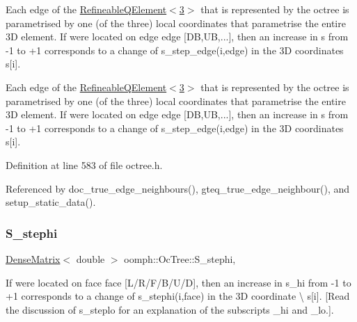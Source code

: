 Each edge of the \hyperlink{classoomph_1_1RefineableQElement_3_013_01_4}{Refineable\+Q\+Element$<$3$>$} that is represented by the octree is parametrised by one (of the three) local coordinates that parametrise the entire 3D element. If we\textquotesingle{}re located on edge {\ttfamily edge} \mbox{[}DB,UB,...\mbox{]}, then an increase in s from -\/1 to +1 corresponds to a change of {\ttfamily s\+\_\+step\+\_\+edge(i,edge)} in the 3D coordinates {\ttfamily s}\mbox{[}i\mbox{]}. 

Each edge of the \hyperlink{classoomph_1_1RefineableQElement_3_013_01_4}{Refineable\+Q\+Element$<$3$>$} that is represented by the octree is parametrised by one (of the three) local coordinates that parametrise the entire 3D element. If we\textquotesingle{}re located on edge {\ttfamily edge} \mbox{[}DB,UB,...\mbox{]}, then an increase in s from -\/1 to +1 corresponds to a change of {\ttfamily s\+\_\+step\+\_\+edge(i,edge)} in the 3D coordinates {\ttfamily s}\mbox{[}i\mbox{]}. 

Definition at line 583 of file octree.\+h.



Referenced by doc\+\_\+true\+\_\+edge\+\_\+neighbours(), gteq\+\_\+true\+\_\+edge\+\_\+neighbour(), and setup\+\_\+static\+\_\+data().

\mbox{\label{classoomph_1_1OcTree_addcc327c9831b6c57f30c8596125c236}} 
\subsubsection{\texorpdfstring{S\+\_\+stephi}{S\_stephi}}
{\footnotesize\ttfamily \hyperlink{classoomph_1_1DenseMatrix}{Dense\+Matrix}$<$ double $>$ oomph\+::\+Oc\+Tree\+::\+S\+\_\+stephi\hspace{0.3cm}{\ttfamily [static]}, {\ttfamily [private]}}



If we\textquotesingle{}re located on face {\ttfamily face} \mbox{[}L/\+R/\+F/\+B/\+U/D\mbox{]}, then an increase in s\+\_\+hi from -\/1 to +1 corresponds to a change of {\ttfamily s\+\_\+stephi(i,face)} in the 3D coordinate \textbackslash{} s\mbox{[}i\mbox{]}. \mbox{[}Read the discussion of {\ttfamily s\+\_\+steplo} for an explanation of the subscripts {\ttfamily \+\_\+hi} and {\ttfamily \+\_\+lo}.\mbox{]}. 

